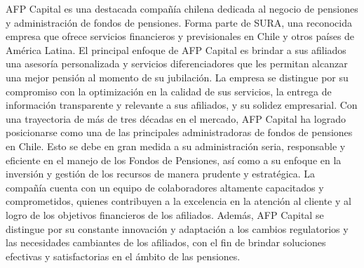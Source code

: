 AFP Capital es una destacada compañía chilena dedicada al negocio de pensiones y administración de fondos de pensiones. Forma parte de SURA, una reconocida empresa que ofrece servicios financieros y previsionales en Chile y otros países de América Latina. El principal enfoque de AFP Capital es brindar a sus afiliados una asesoría personalizada y servicios diferenciadores que les permitan alcanzar una mejor pensión al momento de su jubilación. La empresa se distingue por su compromiso con la optimización en la calidad de sus servicios, la entrega de información transparente y relevante a sus afiliados, y su solidez empresarial. 
Con una trayectoria de más de tres décadas en el mercado, AFP Capital ha logrado posicionarse como una de las principales administradoras de fondos de pensiones en Chile. Esto se debe en gran medida a su administración seria, responsable y eficiente en el manejo de los Fondos de Pensiones, así como a su enfoque en la inversión y gestión de los recursos de manera prudente y estratégica. 
La compañía cuenta con un equipo de colaboradores altamente capacitados y comprometidos, quienes contribuyen a la excelencia en la atención al cliente y al logro de los objetivos financieros de los afiliados. Además, AFP Capital se distingue por su constante innovación y adaptación a los cambios regulatorios y las necesidades cambiantes de los afiliados, con el fin de brindar soluciones efectivas y satisfactorias en el ámbito de las pensiones.
